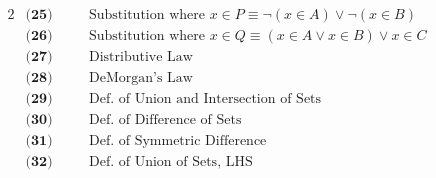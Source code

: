 \begin{alignat*}{2}
&\textbf{(25)} && \quad \text{Substitution where $x \in P \equiv \neg (x \in A) \vee \neg (x \in B)$}\\
&\textbf{(26)} && \quad \text{Substitution where $x \in Q \equiv (x \in A \vee x \in B) \vee x \in C$}\\
&\textbf{(27)} && \quad \text{Distributive Law}\\
&\textbf{(28)} && \quad \text{DeMorgan's Law}\\
&\textbf{(29)} && \quad \text{Def. of Union and Intersection of Sets}\\
&\textbf{(30)} && \quad \text{Def. of Difference of Sets}\\
&\textbf{(31)} && \quad \text{Def. of Symmetric Difference}\\
&\textbf{(32)} && \quad \text{Def. of Union of Sets, LHS}\\        
\end{alignat*}
\pagebreak

